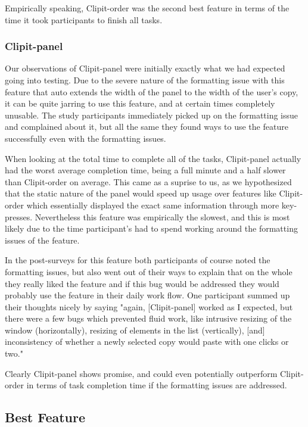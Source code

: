 \documentclass{acm_proc_article-sp}
\begin{document}
Empirically speaking, Clipit-order was the second best feature in terms of the time it took participants to finish all tasks. 

\subsubsection{Clipit-panel}

Our observations of Clipit-panel were initially exactly what we had expected going into testing. Due to the severe nature of the formatting issue with this feature that auto extends the width of the panel to the width of the user's copy, it can be quite jarring to use this feature, and at certain times completely unusable. The study participants immediately picked up on the formatting issue and complained about it, but all the same they found ways to use the feature successfully even with the formatting issues. 

When looking at the total time to complete all of the tasks, Clipit-panel actually had the worst average completion time, being a full minute and a half slower than Clipit-order on average. This came as a suprise to us, as we hypothesized that the static nature of the panel would speed up usage over features like Clipit-order which essentially displayed the exact same information through more key-presses. Nevertheless this feature was empirically the slowest, and this is most likely due to the time participant's had to spend working around the formatting issues of the feature.

In the post-surveys for this feature both participants of course noted the formatting issues, but also went out of their ways to explain that on the whole they really liked the feature and if this bug would be addressed they would probably use the feature in their daily work flow. One participant summed up their thoughts nicely by saying "again, [Clipit-panel] worked as I expected, but there were a few bugs which prevented fluid work, like intrusive resizing of the window (horizontally), resizing of elements in the list (vertically), [and] inconsistency of whether a newly selected copy would paste with one clicks or two."

Clearly Clipit-panel shows promise, and could even potentially outperform Clipit-order in terms of task completion time if the formatting issues are addressed.

\subsection{Best Feature}\label{sec:bestfeature}
\end{document}
